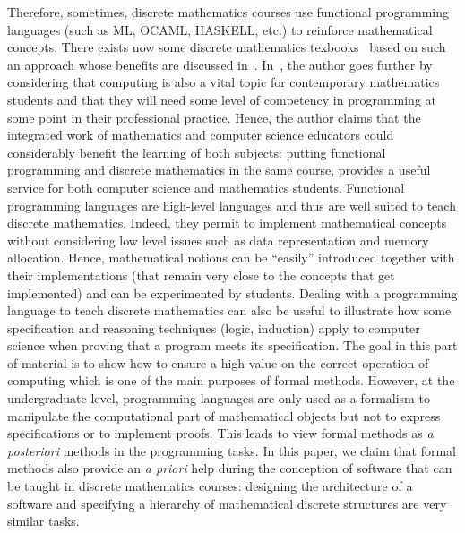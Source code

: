 \documentclass[submission,copyright,creativecommons]{eptcs}
\begin{document}
Therefore, sometimes, discrete mathematics courses 
use functional programming languages (such as ML, OCAML, HASKELL, etc.)  to reinforce mathematical concepts.
There exists now some discrete mathematics
texbooks~\cite{Doets04,books/daglib/0007497,bookvandrunen} based on
such an approach whose
benefits are discussed 
in~\cite{DBLP:conf/sigcse/Wainwright92,oai:CiteSeerXPSU:10.1.1.19.3780,darosa02,Henderson02,DBLP:conf/oopsla/VanDrunen11}.
In~\cite{DBLP:conf/oopsla/VanDrunen11}, the author goes further 
by considering that computing is also a vital topic for
contemporary mathematics students and that they will 
need some level of competency in programming at some point in their
professional practice. Hence, the author claims
that the
integrated work of mathematics and
computer science educators could considerably benefit the learning of
both subjects: putting functional programming and
discrete mathematics in the same course, provides a useful service for
both computer science and mathematics students.
Functional programming languages are high-level languages
and thus are well suited to teach discrete
mathematics. Indeed, 
they permit to implement mathematical concepts without considering low level
issues such as data representation and memory allocation. Hence, 
mathematical notions can be ``easily'' introduced together with their 
implementations (that remain very
close to the concepts that get implemented) and can be experimented
by students.
Dealing with a programming language to teach discrete mathematics can
also be useful to illustrate how some specification and
reasoning techniques (logic, induction) apply to
computer science when proving that a program meets its specification. The goal in this part of material is to show
how to ensure a high value on the correct operation of computing which
is one of the main purposes of formal methods. However, at the
undergraduate level, programming languages are only used as a formalism to manipulate
the computational part of mathematical objects but not to express specifications or to
implement proofs. 
This leads to view formal methods as {\it a posteriori}  methods in the
programming tasks. In this paper, we claim that formal methods also provide 
an {\it a priori} help during the conception of software
that can be
taught in discrete mathematics courses: 
designing the architecture of a software and specifying a hierarchy of
mathematical discrete structures are very similar tasks. 
\end{document}
